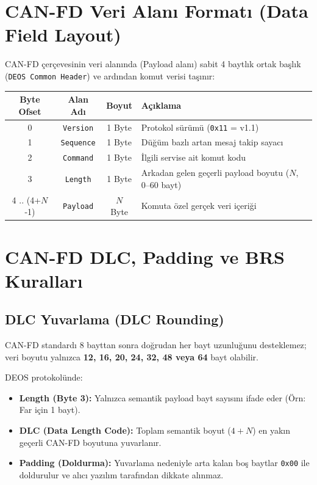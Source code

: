 \documentclass[a4paper,10pt]{article}
\newcommand{\hex}[1]{\texttt{0x#1}}
\newcommand{\code}[1]{\texttt{#1}}
\begin{document}
\section{CAN-FD Veri Alanı Formatı (Data Field Layout)}

CAN-FD çerçevesinin veri alanında (Payload alanı) sabit 4 baytlık ortak başlık (\code{DEOS Common Header}) ve ardından komut verisi taşınır:

\begin{center}
\begin{tabular}{c c c l}
\toprule
\textbf{Byte Ofset} & \textbf{Alan Adı} & \textbf{Boyut} & \textbf{Açıklama} \\
\midrule
0 & \code{Version} & 1 Byte & Protokol sürümü (\hex{11} = v1.1) \\
1 & \code{Sequence} & 1 Byte & Düğüm bazlı artan mesaj takip sayacı \\
2 & \code{Command} & 1 Byte & İlgili servise ait komut kodu \\
3 & \code{Length} & 1 Byte & Arkadan gelen geçerli payload boyutu ($N$, 0--60 bayt) \\
\midrule
4 .. (4+$N$-1) & \code{Payload} & $N$ Byte & Komuta özel gerçek veri içeriği \\
\bottomrule
\end{tabular}
\end{center}

\section{CAN-FD DLC, Padding ve BRS Kuralları}

\subsection{DLC Yuvarlama (DLC Rounding)}

CAN-FD standardı 8 bayttan sonra doğrudan her bayt uzunluğunu desteklemez; veri boyutu yalnızca \textbf{12, 16, 20, 24, 32, 48 veya 64} bayt olabilir.

DEOS protokolünde:
\begin{itemize}
    \item \textbf{Length (Byte 3):} Yalnızca semantik payload bayt sayısını ifade eder (Örn: Far için 1 bayt).
    \item \textbf{DLC (Data Length Code):} Toplam semantik boyut ($4 + N$) en yakın geçerli CAN-FD boyutuna yuvarlanır.
    \item \textbf{Padding (Doldurma):} Yuvarlama nedeniyle arta kalan boş baytlar \hex{00} ile doldurulur ve alıcı yazılım tarafından dikkate alınmaz.
\end{itemize}
\end{document}
